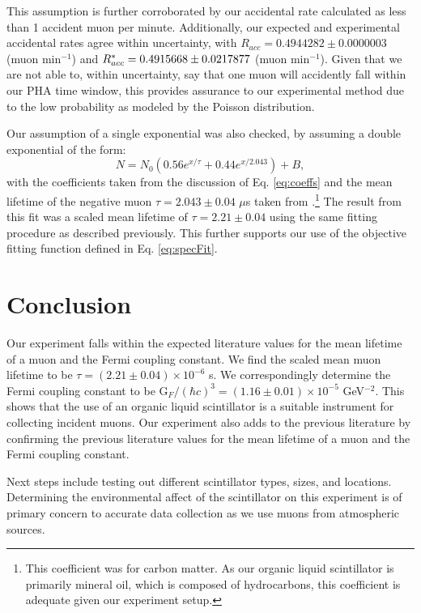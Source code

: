 \documentclass[
    aps, 
    twocolumn, 
    secnumarabic, 
    balancelastpage, 
    amsmath, 
    amssymb, 
    nofootinbib, 
    floatfix
]{revtex4-2}
\begin{document}
This assumption is further corroborated by our accidental rate calculated as less than 1 accident muon per minute. Additionally, our expected and experimental accidental rates agree within uncertainty, with $R_{acc} = 0.4944282\pm 0.0000003$ (muon min$^{-1}$) and $R_{acc}^{\**} = 0.4915668 \pm 0.0217877$ (muon min$^{-1}$). Given that we are not able to, within uncertainty, say that one muon will accidently fall within our PHA time window, this provides assurance to our experimental method due to the low probability as modeled by the Poisson distribution.  

Our assumption of a single exponential was also checked, by assuming a double exponential of the form: 
\begin{equation}
	N = N_0(0.56e^{x/\tau} + 0.44e^{x/2.043}) + B,
\end{equation}
with the coefficients taken from the discussion of Eq. \eqref{eq:coeffs} and the mean lifetime of the negative muon $\tau = 2.043 \pm 0.04$ $\mu$s taken from \cite{reiter1960}.\footnote{This coefficient was for carbon matter. As our organic liquid scintillator is primarily mineral oil, which is composed of hydrocarbons, this coefficient is adequate given our experiment setup.} The result from this fit was a scaled mean lifetime of $\tau = 2.21 \pm 0.04$ using the same fitting procedure as described previously. This further supports our use of the objective fitting function defined in Eq. \eqref{eq:specFit}. 

\section{Conclusion}

Our experiment falls within the expected literature values for the mean lifetime of a muon and the Fermi coupling constant.  We find the scaled mean muon lifetime to be $\tau = (2.21 \pm 0.04) \times 10^{-6}$ s. We correspondingly determine the Fermi coupling constant to be $\text{G}_F/(\hbar c)^3 = (1.16 \pm 0.01) \times 10^{-5}$ GeV$^{-2}$. This shows that the use of an organic liquid scintillator is a suitable instrument for collecting incident muons. Our experiment also adds to the previous literature by confirming the previous literature values for the mean lifetime of a muon and the Fermi coupling constant. 

Next steps include testing out different scintillator types, sizes, and locations. Determining the environmental affect of the scintillator on this experiment is of primary concern to accurate data collection as we use muons from atmospheric sources.
\end{document}
